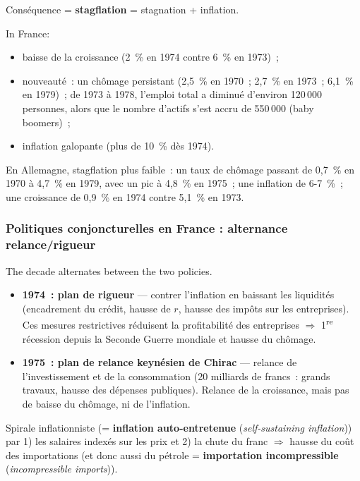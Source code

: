 \begin{definition}[Stagflation]
  Conséquence = \textbf{stagflation} = stagnation + inflation.
\end{definition}

In France:
\begin{itemize}
  \item baisse de la croissance (2~\% en 1974 contre 6~\% en 1973)~;
  \item nouveauté~: un chômage persistant (2,5~\% en 1970~; 2,7~\% en 1973~; 6,1~\% en
    1979)~; de 1973 à 1978, l'emploi total a diminué d'environ 120\,000 personnes, alors
    que le nombre d'actifs s'est accru de 550\,000 (baby boomers)~;
  \item inflation galopante (plus de 10~\% dès 1974).
\end{itemize}
En Allemagne, stagflation plus faible~: un taux de chômage passant de 0,7~\% en 1970 à
4,7~\% en 1979, avec un pic à 4,8~\% en 1975~; une inflation de 6-7~\%~; une croissance
de 0,9~\% en 1974 contre 5,1~\% en 1973.

\subsubsection{Politiques conjoncturelles en France : alternance relance/rigueur}

The decade alternates between the two policies.

\begin{itemize}
  \item \textbf{1974~: plan de rigueur} --- contrer l'inflation en baissant les
    liquidités (encadrement du crédit, hausse de $r$, hausse des impôts sur les
    entreprises). Ces mesures restrictives réduisent la profitabilité des entreprises
    $\Rightarrow$ 1\textsuperscript{re} récession depuis la Seconde Guerre mondiale et
    hausse du chômage.
  \item \textbf{1975~: plan de relance keynésien de Chirac} --- relance de
    l'investissement et de la consommation (20 milliards de francs~: grands travaux,
    hausse des dépenses publiques). Relance de la croissance, mais pas de baisse du
    chômage, ni de l'inflation.
\end{itemize}

\begin{definition}
  Spirale inflationniste (= \textbf{inflation auto-entretenue} (\textit{self-sustaining
  inflation})) par 1) les salaires indexés sur les prix et 2) la chute du franc
  $\Rightarrow$ hausse du coût des importations (et donc aussi du pétrole =
  \textbf{importation incompressible} (\textit{incompressible imports})).
\end{definition}


